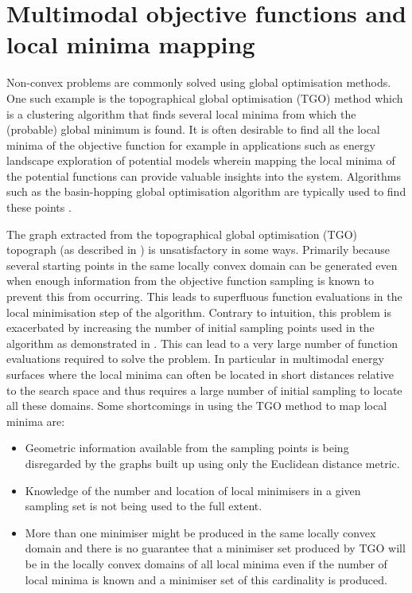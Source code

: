 \section{Multimodal objective functions and local minima mapping}
Non-convex problems are commonly solved using global optimisation methods. One such example is the topographical global optimisation (TGO) method \citep{Henderson2015, Torn1986, Torn1990, Torn1992} which is a clustering algorithm that finds several local minima from which the (probable) global minimum is found. It is often desirable to find all the local minima of the objective function for example in applications such as energy landscape exploration of potential models wherein mapping the local minima of the potential functions can provide valuable insights into the system. Algorithms such as the basin-hopping global optimisation algorithm are typically used to find these points \citep{Wales2015}.





The graph extracted from the topographical global optimisation (TGO) \citep{Henderson2015, Torn1986, Torn1990, Torn1992} topograph (as described in ) is unsatisfactory in some ways. Primarily because several starting points in the same locally convex domain can be generated even when enough information from the objective function sampling is known to prevent this from occurring. This leads to superfluous function evaluations in the local minimisation step of the algorithm. Contrary to intuition, this problem is exacerbated by increasing the number of initial sampling points used in the algorithm as demonstrated in . This can lead to a very large number of function evaluations required to solve the problem. In particular in multimodal energy surfaces where the local minima can often be located in short distances relative to the search space \citep{Zhang2011} and thus requires a large number of initial sampling to locate all these domains. Some shortcomings in using the TGO method to map local minima are:
\begin{itemize}
\item Geometric information available from the sampling points is being disregarded by the graphs built up using only the Euclidean distance metric.
\item Knowledge of the number and location of local minimisers in a given sampling set is not being used to the full extent.
\item More than one minimiser might be produced in the same locally convex domain and there is no guarantee that a minimiser set produced by TGO will be in the locally convex domains of all local minima even if the number of local minima is known and a minimiser set of this cardinality is produced.
\end{itemize}

